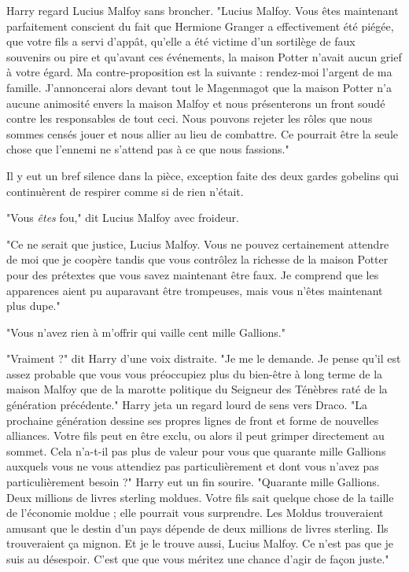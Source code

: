 Harry regard Lucius Malfoy sans broncher. "Lucius Malfoy. Vous êtes maintenant parfaitement conscient du fait que Hermione Granger a effectivement été piégée, que votre fils a servi d'appât, qu'elle a été victime d'un sortilège de faux souvenirs ou pire et qu'avant ces événements, la maison Potter n'avait aucun grief à votre égard. Ma contre-proposition est la suivante : rendez-moi l'argent de ma famille. J'annoncerai alors devant tout le Magenmagot que la maison Potter n'a aucune animosité envers la maison Malfoy et nous présenterons un front soudé contre les responsables de tout ceci. Nous pouvons rejeter les rôles que nous sommes censés jouer et nous allier au lieu de combattre. Ce pourrait être la seule chose que l'ennemi ne s'attend pas à ce que nous fassions."

Il y eut un bref silence dans la pièce, exception faite des deux gardes gobelins qui continuèrent de respirer comme si de rien n'était.

"Vous \emph{êtes}  fou," dit Lucius Malfoy avec froideur.

"Ce ne serait que justice, Lucius Malfoy. Vous ne pouvez certainement attendre de moi que je coopère tandis que vous contrôlez la richesse de la maison Potter pour des prétextes que vous savez maintenant être faux. Je comprend que les apparences aient pu auparavant être trompeuses, mais vous n'êtes maintenant plus dupe."

"Vous n'avez rien à m'offrir qui vaille cent mille Gallions."

"Vraiment ?" dit Harry d'une voix distraite. "Je me le demande. Je pense qu'il est assez probable que vous vous préoccupiez plus du bien-être à long terme de la maison Malfoy que de la marotte politique du Seigneur des Ténèbres raté de la génération précédente." Harry jeta un regard lourd de sens vers Draco. "La prochaine génération dessine ses propres lignes de front et forme de nouvelles alliances. Votre fils peut en être exclu, ou alors il peut grimper directement au sommet. Cela n'a-t-il pas plus de valeur pour vous que quarante mille Gallions auxquels vous ne vous attendiez pas particulièrement et dont vous n'avez pas particulièrement besoin ?" Harry eut un fin sourire. "Quarante mille Gallions. Deux millions de livres sterling moldues. Votre fils sait quelque chose de la taille de l'économie moldue ; elle pourrait vous surprendre. Les Moldus trouveraient amusant que le destin d'un pays dépende de deux millions de livres sterling. Ils trouveraient ça mignon. Et je le trouve aussi, Lucius Malfoy. Ce n'est pas que je suis au désespoir. C'est que que vous méritez une chance d'agir de façon juste."

